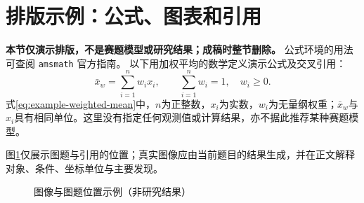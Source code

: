 \section{排版示例：公式、图表和引用}
\label{sec:example-typesetting}
\textbf{本节仅演示排版，不是赛题模型或研究结果；成稿时整节删除。}
公式环境的用法可查阅 \texttt{amsmath} 官方指南\cite{amsmath-guide}。
以下用加权平均的数学定义演示公式及交叉引用：
\begin{equation}
  \bar{x}_{w}=\sum_{i=1}^{n}w_i x_i,
  \qquad \sum_{i=1}^{n}w_i=1,\quad w_i\geq 0.
  \label{eq:example-weighted-mean}
\end{equation}
式\eqref{eq:example-weighted-mean}中，$n$为正整数，$x_i$为实数，$w_i$为无量纲权重；$\bar{x}_{w}$与$x_i$具有相同单位。这里没有指定任何观测值或计算结果，亦不据此推荐某种赛题模型。

图\ref{fig:example-placeholder}仅展示图题与引用的位置；真实图像应由当前题目的结果生成，并在正文解释对象、条件、坐标单位与主要发现。
\begin{figure}[htbp]
  \centering
  \caption{图像与图题位置示例（非研究结果）}
  \label{fig:example-placeholder}
\end{figure}
